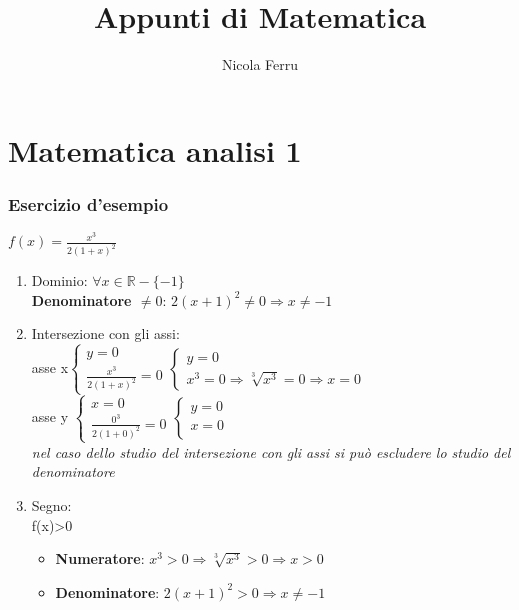 \documentclass{book}
\title{Appunti di Matematica}
\author{Nicola Ferru}
\date{}
\begin{document}
\maketitle
\tableofcontents
\listoftables
\listoffigures


\part{Matematica analisi 1}



\section{Esercizio d'esempio}
$f(x)=\frac{x^3}{2(1+x)^2}$
\begin{enumerate}
	\item Dominio: $\forall x \in \mathds{R} -\{-1\}$\\
		\textbf{Denominatore $\neq 0$}: $2(x+1)^2\neq0\Rightarrow x\neq -1$
	\item Intersezione con gli assi:\\
		asse x$\begin{cases}
			y=0\\
			\frac{x^3}{2(1+x)^2}=0
		\end{cases}
		\begin{cases}
			y=0\\
			x^3=0 \Rightarrow \sqrt[3]{x^3}=0\Rightarrow x=0
		\end{cases}$\\
		asse y $\begin{cases}
			x=0\\
			\frac{0^3}{2(1+0)^2}=0
		\end{cases}
		\begin{cases}
			y=0\\
			x=0\\
		\end{cases}$\\
		\textit{nel caso dello studio del intersezione con gli assi si può escludere lo studio del denominatore}
	\item Segno:\\
		f(x)>0
		\begin{itemize}
			\item \textbf{Numeratore}: $x^3>0 \Rightarrow \sqrt[3]{x^3}>0\Rightarrow x>0$
			\item \textbf{Denominatore}: $2(x+1)^2>0\Rightarrow x\neq -1$

\end{itemize}
\end{enumerate}
\end{document}
